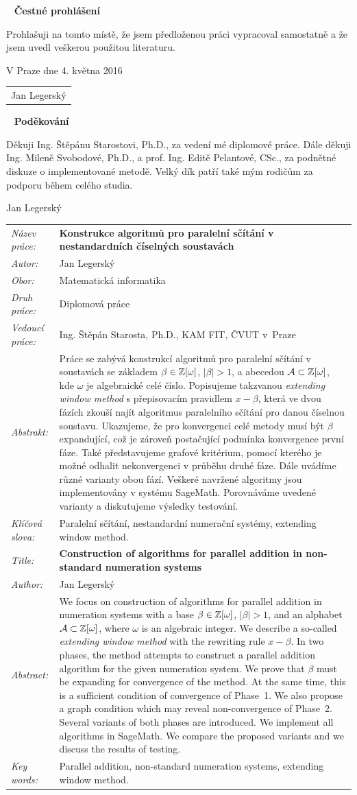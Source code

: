 \documentclass[a4paper, 11pt, twoside, openright]{report}
\theoremstyle{definition}
\newcommand{\obor}{Matematická informatika}
\newcommand{\nazevcz}{Konstrukce algoritm\r u pro paraleln\'i s\v c\'it\'an\'i  v nestandardn\'ich \v c\'iseln\'ych soustav\'ach}
\newcommand{\nazeven}{Construction of algorithms for parallel addition   in non-standard numeration systems}
\newcommand{\autor}{Jan Legersk\'y}
\newcommand{\vedouci}{Ing. \v St\v ep\'an Starosta, Ph.D.}
\newcommand{\pracovisteVed}{KAM FIT, \v CVUT v~Praze}
\newcommand{\konzultant}{---}
\newcommand{\klicova}{Paraleln\'i s\v c\'it\'an\'i, nestandardn\'i numera\v cn\'i syst\'emy, extending window method.}  %
\newcommand{\keyword}{Parallel addition, non-standard numeration systems, extending window method.}
\newcommand{\abstrCZ}%
{Práce se zabývá konstrukcí algoritmů pro paralelní sčítání v soustavách se základem $\beta\in\mathbb{Z}[\omega]$, $|\beta|>1$, a abecedou $\mathcal{A}\subset\mathbb{Z}[\omega]$, kde $\omega$ je algebraické celé číslo. Popisujeme takzvanou \emph{extending window method} s přepisovacím pravidlem $x-\beta$, která ve dvou fázích zkouší najít algoritmus paralelního sčítání pro danou číselnou soustavu. Ukazujeme, že pro konvergenci celé metody musí být $\beta$ expandující, což je zároveň postačující podmínka konvergence první fáze. Také představujeme grafové kritérium, pomocí kterého je možné odhalit nekonvergenci v průběhu druhé fáze. Dále uvádíme různé varianty obou fází. Veškeré navržené algoritmy jsou implementovány v systému SageMath. Porovnáváme uvedené varianty a diskutujeme výsledky testování.
}
\newcommand{\abstrEN}{
We focus on  construction of algorithms for parallel addition in numeration systems with a base $\beta\in\Zomega$, $|\beta|>1$, and an alphabet $\A\subset\Zomega$, where  $\omega$ is an algebraic integer. We describe a so-called \emph{extending window method} with the  rewriting rule $x-\beta$. In two phases, the method attempts to construct a parallel addition algorithm for the given numeration system. We prove that $\beta$ must be expanding for convergence of the method. At the same time, this is a sufficient condition of convergence of Phase~1. We also propose a graph condition which may reveal non-convergence of Phase~2.  Several variants of both phases are introduced. We implement all algorithms in SageMath. We compare the proposed variants and we discuss the results of testing.
}
\begin{document}
\begin{titlepage}
\thispagestyle{empty}
~
\vfill
\noindent\textbf{Čestné prohlášení}
\vspace{0.5cm}

Prohla\v suji na tomto m\'ist\v e, \v ze jsem p\v redlo\v zenou pr\'aci vypracoval samostatn\v e a \v ze jsem uvedl ve\v skerou pou\v zitou literaturu.
\vspace{1.5cm}

\noindent
\vspace{5mm}V Praze dne 4. května 2016\hfill
	\begin{tabular}{c}
	\\[40pt]
	\autor
	\end{tabular}
\cleardoublepage


\thispagestyle{empty}
~
\vfill
\noindent\textbf{Pod\v ekov\'an\'i}
\vspace{0.5cm}

Děkuji Ing. Štěpánu Starostovi, Ph.D., za vedení mé diplomové práce. Dále děkuji Ing. Mileně Svobodové, Ph.D., a prof. Ing. Editě Pelantové, CSc., za  podnětné diskuze o implementované metodě. Velký dík patří také mým rodičům za podporu během celého studia.

\begin{flushright}
\autor
\end{flushright}
\cleardoublepage


\thispagestyle{empty}

\noindent
\begin{tabular}{lp{}}
  {\em N\'azev pr\'ace:} & \bf \nazevcz \\[4mm]
  {\em Autor:} & \autor \\[4mm]
  {\em Obor:} & \obor \\[4mm]
  {\em Druh pr\'ace:} & Diplomová práce \\[4mm]
  {\em Vedoucí práce:} & \vedouci, \pracovisteVed \\[4mm]
  {\em Abstrakt:} & \abstrCZ \\[4mm]
  {\em Kl\'i\v cov\'a slova:} & \klicova \\[8mm]

  {\em Title:} & \bf \nazeven \\[4mm]
  {\em Author:} & \autor \\[4mm]
  {\em Abstract:} & \abstrEN \\[4mm]
  {\em Key words:} & \keyword
\end{tabular}
\cleardoublepage


\thispagestyle{empty}
\renewcommand\contentsname{\vspace{-3cm} Contents \vspace{-0.8cm}}
\tableofcontents
\thispagestyle{empty}

\cleardoublepage
\thispagestyle{empty}

\thispagestyle{empty}
\cleardoublepage
\end{titlepage}
\end{document}
